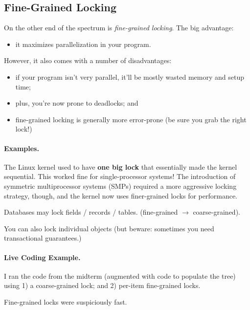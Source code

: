 \subsection*{Fine-Grained Locking}
On the other end of the spectrum is \emph{fine-grained locking}. The big
advantage:
  \begin{itemize}
    \item it maximizes parallelization in your program.
  \end{itemize}

However, it also comes with a number of disadvantages:
  \begin{itemize}
    \item if your program isn't very parallel, it'll be mostly wasted memory and setup time;
    \item plus, you're now prone to deadlocks; and
    \item fine-grained locking is generally more error-prone (be sure you grab the right lock!)
  \end{itemize}

\paragraph{Examples.}
    The Linux kernel used to have {\bf one big lock} that essentially
    made the kernel sequential.  This worked fine for single-processor
    systems!  The introduction of symmetric multiprocessor systems
    (SMPs) required a more aggressive locking strategy, though, and
    the kernel now uses finer-grained locks for performance.

    Databases may lock fields / records / tables. (fine-grained $\rightarrow$ coarse-grained).

    You can also lock individual objects (but beware: sometimes you need transactional guarantees.)

\paragraph{Live Coding Example.} I ran the code from the midterm (augmented with
code to populate the tree) using 1) a coarse-grained lock; and 2)
per-item fine-grained locks.

Fine-grained locks were suspiciously fast.





